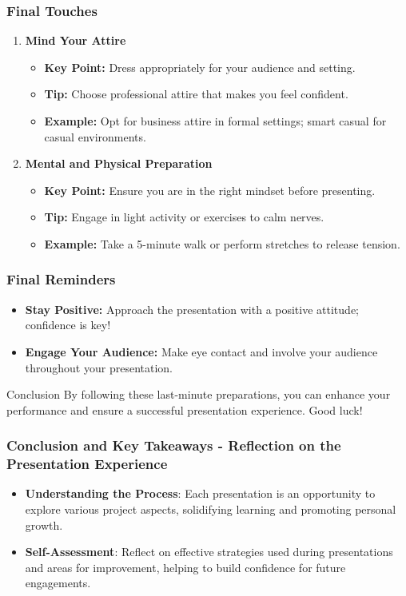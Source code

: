 \documentclass[aspectratio=169]{beamer}
\begin{document}
\begin{frame}[fragile]
    \frametitle{Final Touches}
    \begin{enumerate}
        \item \textbf{Mind Your Attire}
        \begin{itemize}
            \item \textbf{Key Point:} Dress appropriately for your audience and setting.
            \item \textbf{Tip:} Choose professional attire that makes you feel confident.
            \item \textbf{Example:} Opt for business attire in formal settings; smart casual for casual environments.
        \end{itemize}

        \item \textbf{Mental and Physical Preparation}
        \begin{itemize}
            \item \textbf{Key Point:} Ensure you are in the right mindset before presenting.
            \item \textbf{Tip:} Engage in light activity or exercises to calm nerves.
            \item \textbf{Example:} Take a 5-minute walk or perform stretches to release tension.
        \end{itemize}
    \end{enumerate}
\end{frame}

\begin{frame}[fragile]
    \frametitle{Final Reminders}
    \begin{itemize}
        \item \textbf{Stay Positive:} Approach the presentation with a positive attitude; confidence is key!
        \item \textbf{Engage Your Audience:} Make eye contact and involve your audience throughout your presentation.
    \end{itemize}
    \begin{block}{Conclusion}
        By following these last-minute preparations, you can enhance your performance and ensure a successful presentation experience. Good luck!
    \end{block}
\end{frame}

\begin{frame}[fragile]
    \frametitle{Conclusion and Key Takeaways - Reflection on the Presentation Experience}
    \begin{itemize}
        \item \textbf{Understanding the Process}: Each presentation is an opportunity to explore various project aspects, solidifying learning and promoting personal growth.
        \item \textbf{Self-Assessment}: Reflect on effective strategies used during presentations and areas for improvement, helping to build confidence for future engagements.
    \end{itemize}
\end{frame}
\end{document}
